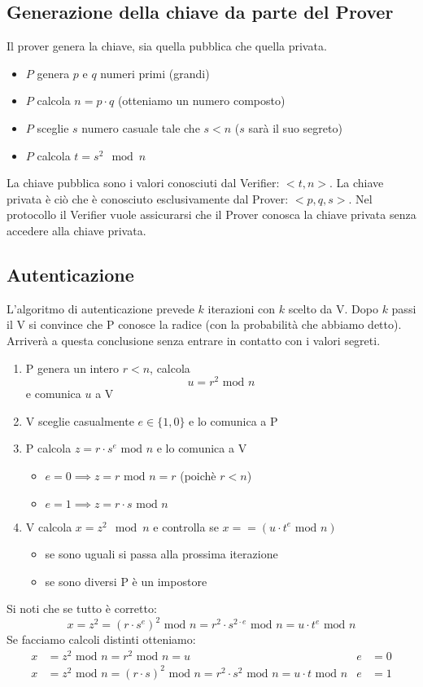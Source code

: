 \subsection{Generazione della chiave da parte del Prover}
Il prover genera la chiave, sia quella pubblica che quella privata.
\begin{itemize}
    \item $P$ genera $p$ e $q$ numeri primi (grandi)
    \item $P$ calcola $n = p \cdot q$ (otteniamo un numero composto)
    \item $P$ sceglie $s$ numero casuale tale che $s < n$ ($s$ sarà il suo segreto)
    \item $P$ calcola $\boxed{t = s^2 \mod n}$
\end{itemize}
La chiave pubblica sono i valori conosciuti dal Verifier: $<t,n>$. La chiave privata è ciò che è conosciuto esclusivamente dal Prover: $<p, q, s>$. Nel protocollo il Verifier vuole assicurarsi che il Prover conosca la chiave privata senza accedere alla chiave privata.

\subsection{Autenticazione}
L'algoritmo di autenticazione prevede $k$ iterazioni con $k$ scelto da V. Dopo $k$ passi il V si convince che P conosce la radice (con la probabilità che abbiamo detto). Arriverà a questa conclusione senza entrare in contatto con i valori segreti. 
\begin{enumerate}
    \item P genera un intero $r < n$, calcola $$\boxed{u = r^2 \text{ mod } n}$$ e comunica $u$ a V
    \item V sceglie casualmente $e \in \{1, 0\}$ e lo comunica a P
    \item P calcola $z = r \cdot s^e \text{ mod } n$ e lo comunica a V
    \begin{itemize}
        \item $e = 0 \implies z = r \text{ mod } n = r$ (poichè $r<n$)
        \item $e = 1 \implies z = r \cdot s \text{ mod } n$
    \end{itemize}
    \item V calcola $x = z^2 \mod n$ e controlla se $x == (u \cdot t^e \text{ mod } n)$
    \begin{itemize}
        \item se sono uguali si passa alla prossima iterazione
        \item se sono diversi P è un impostore
    \end{itemize}
\end{enumerate}
Si noti che se tutto è corretto:
$$                                
x = z^2 = (r \cdot s^e)^2 \text{ mod } n= r^2 \cdot s^{2 \cdot e}  \text{ mod } n= u \cdot t^{e} \text{ mod } n
$$
Se facciamo calcoli distinti otteniamo:
\begin{align*}
	x&=z^2\text{ mod }n=r^2 \text{ mod }n=u &e&=0\\
	x&=z^2 \text{ mod }n=(r\cdot s)^2 \text{ mod }n=r^2 \cdot s^2 \text{ mod }n=u \cdot t \text{ mod } n&e&=1
\end{align*}

